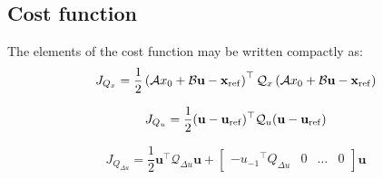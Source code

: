 \documentclass[a4paper,12pt,fleqn]{article}
\newcommand{\varxvec}{\mathbf{x}}
\newcommand{\varuvec}{\mathbf{u}}
\newcommand{\baru}{u_{-1}}
\begin{document}
\subsection{Cost function}
The elements of the cost function may be written compactly as:
\begin{equation}
\label{eq:JQx_dense}
 J_{Q_x} = \frac{1}{2} \left(\mathcal{A} x_0 + \mathcal{B} \varuvec - \varxvec_{\rm ref}\right)^\top \mathcal{Q}_x \left(\mathcal{A} x_0 + \mathcal{B} \varuvec - \varxvec_{\rm ref}\right)
\end{equation}

\begin{equation}
 J_{Q_u} =  \frac{1}{2} (\varuvec - \varuvec_{\rm ref})^\top \mathcal{Q}_u (\varuvec-\varuvec_{\rm ref})
\end{equation}

\begin{equation}
 J_{Q_{\Delta u}} =  \frac{1}{2} \varuvec^\top \mathcal{Q}_{\Delta u} \varuvec +   
 \begin{bmatrix}
  -{\baru}^\top Q_{\Delta u} & 0 & \dots  & 0
 \end{bmatrix} \varuvec
\end{equation}
\end{document}

